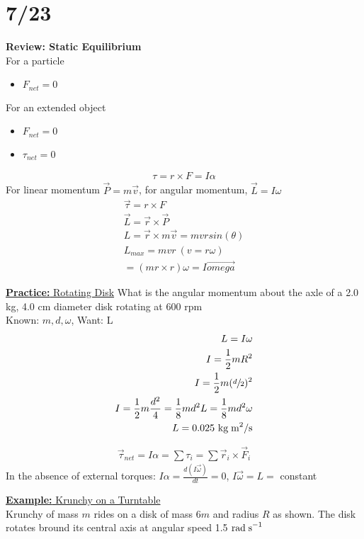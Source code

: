 \documentclass[a4paper]{article}
\let\bf\textbf
\newcommand\rads{\text{ rad\;s}^{-1}}
\newcommand\kgmm{\text{ kg\;m}^{2}}
\begin{document}
\section{7/23}
\bf{Review: Static Equilibrium}\\
For a particle
\begin{itemize}
    \item $F_{net} = 0$
\end{itemize}
For an extended object
\begin{itemize}
    \item $F_{net} = 0$
    \item $\tau_{net} = 0$
\end{itemize}
\begin{align*}
    \tau = r\times F = I\alpha
\end{align*}
For linear momentum $\vec{P} = m\vec{v}$, for angular momentum, $\vec{L} = I\omega$
\begin{align*}
    \vec{\tau} = r\times F\\
    \vec{L} = \vec{r} \times \vec{P}\\
    L = \vec{r}\times m\vec{v} = mvrsin(\theta)\\
    L_{max} = mvr\ (v = r\omega)\\
    = (mr\times r)\omega = I\vec{omega}
\end{align*}
\begin{shaded}
    \underline{\bf{Practice:} Rotating Disk}
    What is the angular momentum about the axle of a 2.0 kg, 4.0 cm diameter disk rotating at 600 rpm\\
    Known: $m, d, \omega$, Want: L
    \begin{align*}
        L = I\omega\\
        I = \frac{1}{2}mR^2\\
        I = \frac{1}{2}m(\sfrac{d}{2})^2\\
        I = \frac{1}{2}m\frac{d^2}{4} = \frac{1}{8}md^2
        L = \frac{1}{8}md^2\omega\\
        L = 0.025\kgmm\text{/s}
    \end{align*}
\end{shaded}
\begin{align*}
    \vec{\tau}_{net} = I\alpha = \sum\tau_i = \sum\vec{r}_i\times \vec{F}_i
\end{align*}
In the absence of external torques: $\displaystyle I\alpha = \frac{d(I\vec{\omega})}{dt} = 0$, $I\vec{\omega} = L =$ constant

\begin{shaded}
    \underline{\bf{Example:} Krunchy on a Turntable}
    \vspace{2mm}\\
    Krunchy of mass $m$ rides on a disk of mass $6m$ and radius $R$ as shown. The disk rotates bround its central axis at angular speed 1.5$\rads$
\end{shaded}
\end{document}
